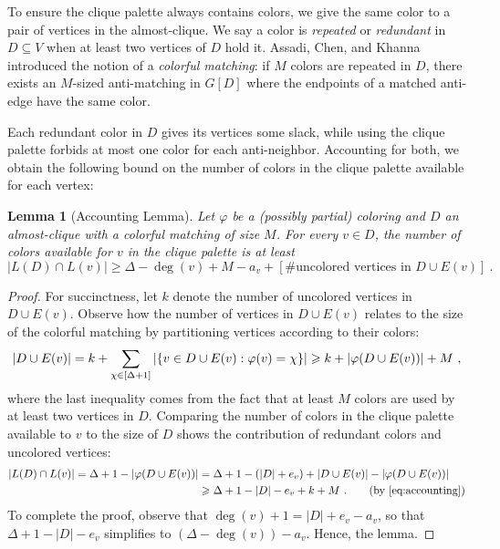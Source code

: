 \documentclass[a4paper,english,11pt]{amsart}
\newtheorem{lemma}{Lemma}[section]
\theoremstyle{definition}
\renewcommand{\geq}{\geqslant}
\DeclarePairedDelimiter{\set}{\{}{\}}
\newcommand{\col}{\varphi}
\begin{document}
To ensure the clique palette always contains colors, we give the same color to a pair of vertices in the almost-clique.
We say a color is \emph{repeated} or \emph{redundant} in $D \subseteq V$ when at least two vertices of $D$ hold it. Assadi, Chen, and Khanna \cite{ACK19} introduced the notion of a \emph{colorful matching}: if $M$ colors are repeated in $D$, there exists an $M$-sized anti-matching in $G[D]$ where the endpoints of a matched anti-edge have the same color.

Each redundant color in $D$ gives its vertices some slack, while using the clique palette forbids at most one color for each anti-neighbor. Accounting for both, we obtain the following bound on the number of colors in the clique palette available for each vertex:
\begin{lemma}[Accounting Lemma]
    \label{prop:accounting}
    Let $\col$ be a (possibly partial) coloring and $D$ an almost-clique with a colorful matching of size $M$. For every $v\in D$,
    the number of colors available for $v$ in the clique palette is at least
    \[
        |L(D) \cap L(v)|
        \geq \Delta - \deg(v) + M - a_v + [\#\text{uncolored vertices in $D \cup E(v)$}] \ .
    \]
\end{lemma}

\begin{proof}
    For succinctness, let $k$ denote the number of uncolored vertices in $D\cup E(v)$. Observe how the number of vertices in $D \cup E(v)$ relates to the size of the colorful matching by partitioning vertices according to their colors:
    \begin{equation}
        \label{eq:accounting}
        |D \cup E(v)|
        = k + \sum_{\chi \in [\Delta+1]} |\set{ v \in D \cup E(v): \col(v) = \chi}|
        \geq
        k
        + |\col(D \cup E(v))| + M \ ,
    \end{equation}
    where the last inequality comes from the fact that at least $M$ colors are used by at least two vertices in $D$.
    Comparing the number of colors in the clique palette available to $v$ to the size of $D$ shows the contribution of redundant colors and uncolored vertices:
    \begin{align*}
        |L(D) \cap L(v)|
        = \Delta + 1 - |\col(D \cup E(v))|
        &= \Delta + 1 - (|D| + e_v) + |D \cup E(v)| - |\col(D \cup E(v))| \\
        &\geq \Delta + 1 - |D| - e_v + k + M \ . \tag{by \cref{eq:accounting}}
    \end{align*}
    To complete the proof, observe that $\deg(v) + 1 = |D| + e_v - a_v$, so that $\Delta + 1 - |D| - e_v$ simplifies to $(\Delta - \deg(v)) - a_v$. Hence, the lemma.
\end{proof}
\end{document}
